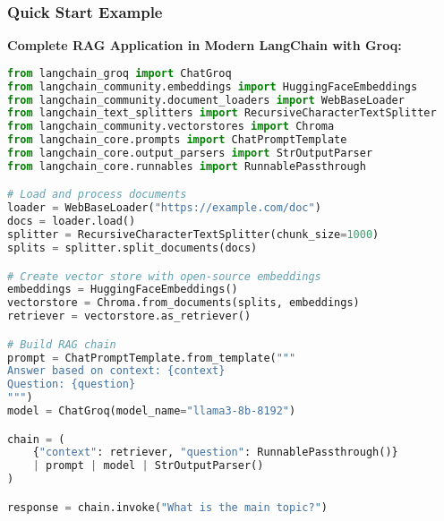 \begin{frame}[fragile]\frametitle{Quick Start Example}

\textbf{Complete RAG Application in Modern LangChain with Groq:}
\begin{lstlisting}[language=python, basicstyle=\tiny]
from langchain_groq import ChatGroq
from langchain_community.embeddings import HuggingFaceEmbeddings
from langchain_community.document_loaders import WebBaseLoader
from langchain_text_splitters import RecursiveCharacterTextSplitter
from langchain_community.vectorstores import Chroma
from langchain_core.prompts import ChatPromptTemplate
from langchain_core.output_parsers import StrOutputParser
from langchain_core.runnables import RunnablePassthrough

# Load and process documents
loader = WebBaseLoader("https://example.com/doc")
docs = loader.load()
splitter = RecursiveCharacterTextSplitter(chunk_size=1000)
splits = splitter.split_documents(docs)

# Create vector store with open-source embeddings
embeddings = HuggingFaceEmbeddings()
vectorstore = Chroma.from_documents(splits, embeddings)
retriever = vectorstore.as_retriever()

# Build RAG chain
prompt = ChatPromptTemplate.from_template("""
Answer based on context: {context}
Question: {question}
""")
model = ChatGroq(model_name="llama3-8b-8192")

chain = (
    {"context": retriever, "question": RunnablePassthrough()}
    | prompt | model | StrOutputParser()
)

response = chain.invoke("What is the main topic?")
\end{lstlisting}

\end{frame}

